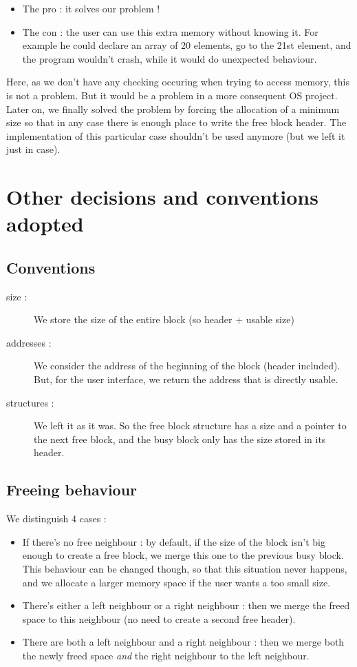\documentclass[twoside]{article}
\begin{document}
\begin{itemize}
	\item The pro : it solves our problem !
	\item The con : the user can use this extra memory without knowing it. For 
		example he could declare an array of 20 elements, go to the 21st element,
		and the program wouldn't crash, while it would do unexpected behaviour.
\end{itemize}

Here, as we don't have any checking occuring when trying to access memory,
this is not a problem. But it would be a problem in a more consequent OS 
project.\\

Later on, we finally solved the problem by forcing the allocation of a minimum size
so that in any case there is enough place to write the free block header. The
implementation of this particular case shouldn't be used anymore (but we left it
just in case).

\section{Other decisions and conventions adopted}
\subsection{Conventions}
\begin{description}
	\item[size :] We store the size of the entire block (so header + usable 
		size)
	\item[addresses :] We consider the address of the beginning of the block
		(header included). But, for the user interface, we return the address
		that is directly usable.
	\item[structures :] We left it as it was. So the free block structure has
		a size and a pointer to the next free block, and the busy block only
		has the size stored in its header.
\end{description}

\subsection{Freeing behaviour}
We distinguish 4 cases :
\begin{itemize}
	\item If there's no free neighbour : by default, if the size of the block
		isn't big enough to create a free block, we merge this one to the
		previous busy block. This behaviour can be changed though, so that this
		situation never happens, and we allocate a larger memory space if the
		user wants a too small size.
	\item There's either a left neighbour or a right neighbour : then we merge
		the freed space to this neighbour (no need to create a second free
		header).
	\item There are both a left neighbour and a right neighbour : then we merge
		both the newly freed space \emph{and} the right neighbour to the left
		neighbour.
\end{itemize}
\end{document}
